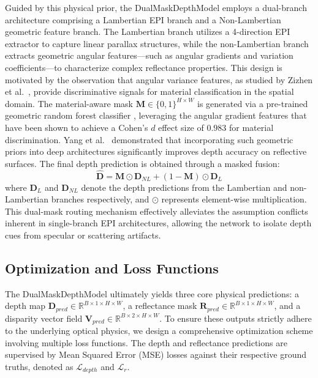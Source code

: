 \documentclass[lettersize,journal]{IEEEtran}
\begin{document}
Guided by this physical prior, the DualMaskDepthModel employs a dual-branch architecture comprising a Lambertian EPI branch and a Non-Lambertian geometric feature branch. The Lambertian branch utilizes a 4-direction EPI extractor to capture linear parallax structures, while the non-Lambertian branch extracts geometric angular features---such as angular gradients and variation coefficients---to characterize complex reflectance properties. This design is motivated by the observation that angular variance features, as studied by Zizhen et al.~\cite{zizhen2020}, provide discriminative signals for material classification in the spatial domain. The material-aware mask $\mathbf{M} \in \{0, 1\}^{H \times W}$ is generated via a pre-trained geometric random forest classifier \cite{wanner2014}, leveraging the angular gradient features that have been shown to achieve a Cohen's $d$ effect size of $0.983$ for material discrimination. Yang et al.~\cite{yang2023} demonstrated that incorporating such geometric priors into deep architectures significantly improves depth accuracy on reflective surfaces. The final depth prediction is obtained through a masked fusion:
\begin{equation}
\hat{\mathbf{D}} = \mathbf{M} \odot \mathbf{D}_{NL} + (1 - \mathbf{M}) \odot \mathbf{D}_{L}
\end{equation}
where $\mathbf{D}_{L}$ and $\mathbf{D}_{NL}$ denote the depth predictions from the Lambertian and non-Lambertian branches respectively, and $\odot$ represents element-wise multiplication. This dual-mask routing mechanism effectively alleviates the assumption conflicts inherent in single-branch EPI architectures, allowing the network to isolate depth cues from specular or scattering artifacts.

\subsection{Optimization and Loss Functions}

The DualMaskDepthModel ultimately yields three core physical predictions: a depth map $\mathbf{D}_{pred} \in \mathbb{R}^{B \times 1 \times H \times W}$, a reflectance mask $\mathbf{R}_{pred} \in \mathbb{R}^{B \times 1 \times H \times W}$, and a disparity vector field $\mathbf{V}_{pred} \in \mathbb{R}^{B \times 2 \times H \times W}$. To ensure these outputs strictly adhere to the underlying optical physics, we design a comprehensive optimization scheme involving multiple loss functions. The depth and reflectance predictions are supervised by Mean Squared Error (MSE) losses against their respective ground truths, denoted as $\mathcal{L}_{depth}$ and $\mathcal{L}_{r}$. 
\end{document}
